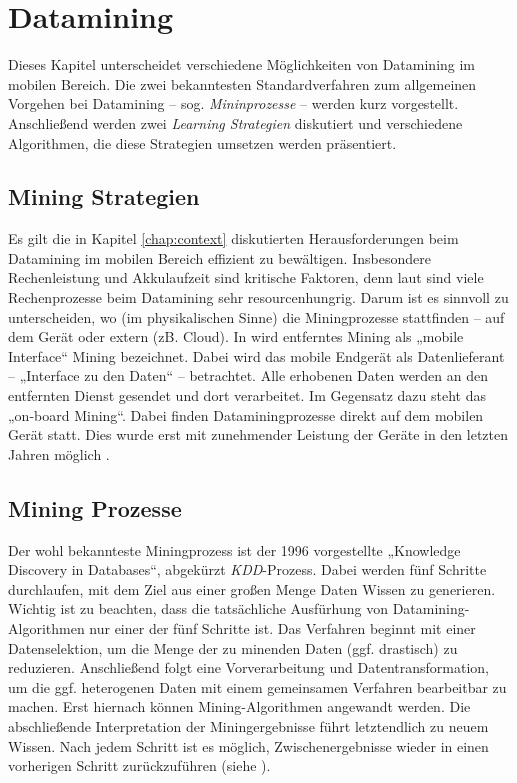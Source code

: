 \chapter{Datamining}
\label{chap:datamining}

Dieses Kapitel unterscheidet verschiedene Möglichkeiten von Datamining im mobilen Bereich. Die zwei bekanntesten Standardverfahren zum allgemeinen Vorgehen bei Datamining -- sog. \textit{Mininprozesse} -- werden kurz vorgestellt. Anschließend werden zwei \textit{Learning Strategien} diskutiert und verschiedene Algorithmen, die diese Strategien umsetzen werden präsentiert.

\section{Mining Strategien}

Es gilt die in Kapitel \ref{chap:context} diskutierten Herausforderungen beim Datamining im mobilen Bereich effizient zu bewältigen. Insbesondere Rechenleistung und Akkulaufzeit sind kritische Faktoren, denn laut \cite{pocket2014} sind viele Rechenprozesse beim Datamining sehr resourcenhungrig. Darum ist es sinnvoll zu unterscheiden, wo (im physikalischen Sinne) die Miningprozesse stattfinden -- auf dem Gerät oder extern (zB. Cloud). In \cite{pocket2014} wird entferntes Mining als „mobile Interface“ Mining bezeichnet. Dabei wird das mobile Endgerät als Datenlieferant -- „Interface zu den Daten“ -- betrachtet. Alle erhobenen Daten werden an den entfernten Dienst gesendet und dort verarbeitet. Im Gegensatz dazu steht das „on-board Mining“. Dabei finden Dataminingprozesse direkt auf dem mobilen Gerät statt. Dies wurde erst mit zunehmender Leistung der Geräte in den letzten Jahren möglich \cite{pocket2014}.

\section{Mining Prozesse}

Der wohl bekannteste Miningprozess ist der 1996 vorgestellte „Knowledge Discovery in Databases“\cite{kdd96}, abgekürzt \textit{KDD}-Prozess. Dabei werden fünf Schritte durchlaufen, mit dem Ziel aus einer großen Menge Daten Wissen zu generieren. Wichtig ist zu beachten, dass die tatsächliche Ausfürhung von Datamining-Algorithmen nur einer der fünf Schritte ist. Das Verfahren beginnt mit einer Datenselektion, um die Menge der zu minenden Daten (ggf. drastisch) zu reduzieren. Anschließend folgt eine Vorverarbeitung und Datentransformation, um die ggf. heterogenen Daten mit einem gemeinsamen Verfahren bearbeitbar zu machen. Erst hiernach können Mining-Algorithmen angewandt werden. Die abschließende Interpretation der Miningergebnisse führt letztendlich zu neuem Wissen. Nach jedem Schritt ist es möglich, Zwischenergebnisse wieder in einen vorherigen Schritt zurückzuführen (siehe \cite{kdd96}).

